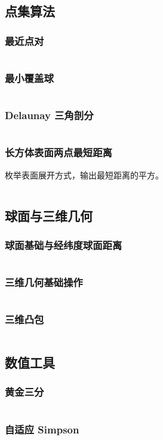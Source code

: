 \subsection{点集算法}
	\subsubsection{最近点对}
		\inputminted{cpp}{sections/ComputationalGeometry/assets/Geometry/最近点对.cpp}
	\subsubsection{最小覆盖球}
		\inputminted{cpp}{sections/ComputationalGeometry/assets/Geometry/最小覆盖球.cpp}
	\subsubsection{Delaunay 三角剖分}
		\inputminted{cpp}{sections/ComputationalGeometry/assets/Geometry/DelaunayTriangulation.cpp}
	\subsubsection{长方体表面两点最短距离}
		枚举表面展开方式，输出最短距离的平方。
		\inputminted{cpp}{sections/ComputationalGeometry/assets/Geometry/长方体表面两点最短距离.cpp}

\subsection{球面与三维几何}
	\subsubsection{球面基础与经纬度球面距离}
		\begin{small}
			
		\end{small}
		\inputminted{cpp}{sections/ComputationalGeometry/assets/Geometry/经纬度求球面最短距离.cpp}
	\subsubsection{三维几何基础操作}
		\inputminted{cpp}{sections/ComputationalGeometry/assets/Geometry/三维几何.cpp}
	\subsubsection{三维凸包}
		\inputminted{cpp}{sections/ComputationalGeometry/assets/Geometry/三维凸包.cpp}

\subsection{数值工具}
	\subsubsection{黄金三分}
		\inputminted[highlightlines={7}]{cpp}{sections/ComputationalGeometry/assets/yzh/golden_ternary.cpp}
	\subsubsection{自适应 Simpson}
		\inputminted{cpp}{sections/ComputationalGeometry/assets/Math/Simpson.cpp}

